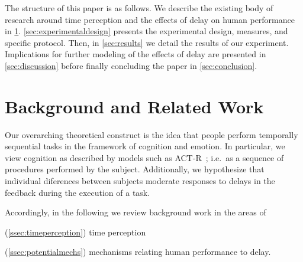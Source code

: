 \documentclass[10pt,letterpaper]{article}
\providecommand{\DIFaddtex}[1]{#1} %
\providecommand{\DIFaddbegin}{\protect\color{blue}} %
\providecommand{\DIFadd}[1]{\texorpdfstring{\DIFaddtex{#1}}{#1}} %
\newcommand{\DIFaddincludegraphics}[2][]{{\color{blue}\fbox{\DIFOincludegraphics[#1]{#2}}}} %
\DeclareRobustCommand{\DIFaddbegin}{\DIFOaddbegin \let\includegraphics\DIFaddincludegraphics} %
\begin{document}
The structure of this paper is as follows.
We describe the existing body of research around time perception and the effects of delay on human performance in \cref{sec:background}.
\cref{sec:experimentaldesign} presents the experimental design, measures, and specific protocol.
Then, in \cref{sec:results} we detail the results of our experiment.
Implications for further modeling of the effects of delay are presented in \cref{sec:discussion} before finally concluding the paper in \cref{sec:conclusion}.

\section{Background and Related Work}\label{sec:background}
\DIFaddbegin 




\DIFadd{Our overarching theoretical construct is the idea that people perform temporally sequential tasks in the framework of cognition and emotion.
In particular, we view cognition as described by models such as }{\DIFadd{ACT-R}}\DIFadd{~}\autocite{neves1981knowledge}\DIFadd{; i.e.\ as a sequence of procedures performed by the subject.
Additionally, we hypothesize that individual diferences between subjects moderate responses to delays in the feedback during the execution of a task. 
}

\DIFadd{Accordingly, in the following we review background work in the areas of 
}\begin{enumerate*}[label={}, before=\unskip{: }, itemjoin={{; }}, itemjoin*={{; and }}]
  \item[\DIFadd{(\cref{ssec:timeperception})}] time perception
  \item[\DIFadd{(\cref{ssec:potentialmechs})}] mechanisms relating human performance to delay.
\end{enumerate*}
\end{document}
